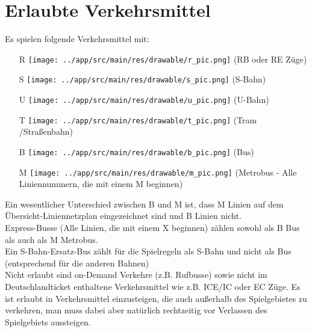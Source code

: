 \documentclass[12pt,a4paper]{article}
\begin{document}
\section{Erlaubte Verkehrsmittel}
Es spielen folgende Verkehrsmittel mit:
\begin{itemize}
	\item[R] {\texttt{[image: ../app/src/main/res/drawable/r\_pic.png]}} (RB oder RE Züge)
	\item[S] {\texttt{[image: ../app/src/main/res/drawable/s\_pic.png]}} (S-Bahn)
	\item[U] {\texttt{[image: ../app/src/main/res/drawable/u\_pic.png]}} (U-Bahn)
	\item[T] {\texttt{[image: ../app/src/main/res/drawable/t\_pic.png]}} (Tram /Straßenbahn)
	\item[B] {\texttt{[image: ../app/src/main/res/drawable/b\_pic.png]}} (Bus)
	\item[M] {\texttt{[image: ../app/src/main/res/drawable/m\_pic.png]}} (Metrobus - Alle Liniennummern, die mit einem M beginnen)
\end{itemize}
Ein wesentlicher Unterschied zwischen B und M ist, dass M Linien auf dem Übersicht-Liniennetzplan eingezeichnet sind und B Linien nicht.\\
Express-Busse (Alle Linien, die mit einem X beginnen) zählen sowohl als B Bus als auch als M Metrobus.\\
Ein S-Bahn-Ersatz-Bus zählt für die Spielregeln als S-Bahn und nicht als Bus (entsprechend für die anderen Bahnen)
\\
Nicht erlaubt sind on-Demand Verkehre (z.B. Rufbusse) sowie nicht im Deutschlandticket enthaltene Verkehrsmittel wie z.B. ICE/IC oder EC Züge.
Es ist erlaubt in Verkehrsmittel einzusteigen, die auch außerhalb des Spielgebietes zu verkehren, man muss dabei aber natürlich rechtzeitig vor Verlassen des Spielgebiets aussteigen.
\end{document}
